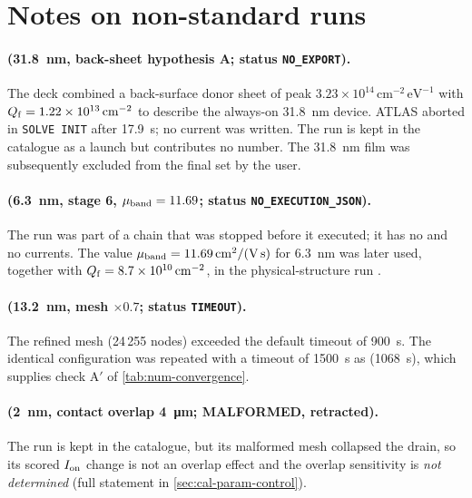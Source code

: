 

\section{Notes on non-standard runs}\label{sec:app-runs-notes}

\paragraph{ (\SI{31.8}{nm}, back-sheet hypothesis A; status \texttt{NO\_EXPORT}).} The deck combined a
back-surface donor sheet of peak $3.23\times10^{14}\,\mathrm{cm^{-2}\,eV^{-1}}$ with $Q_{\mathrm{f}} = 1.22\times10^{13}\,\mathrm{cm}^{-2}$ to
describe the always-on \SI{31.8}{nm} device. ATLAS aborted in \texttt{SOLVE INIT} after \SI{17.9}{s}; no current was
written. The run is kept in the catalogue as a launch but contributes no number. The \SI{31.8}{nm} film was
subsequently excluded from the final set by the user.

\paragraph{ (\SI{6.3}{nm}, stage 6, $\mu_{\mathrm{band}} = 11.69$; status \texttt{NO\_EXECUTION\_JSON}).} The run was
part of a chain that was stopped before it executed; it has no  and no currents. The value
$\mu_{\mathrm{band}} = \SI{11.69}{cm^2/(V.s)}$ for \SI{6.3}{nm} was later used, together with $Q_{\mathrm{f}} = 8.7\times10^{10}\,\mathrm{cm}^{-2}$, in the
physical-structure run .

\paragraph{ (\SI{13.2}{nm}, mesh $\times 0.7$; status \texttt{TIMEOUT}).} The refined mesh (24\,255 nodes)
exceeded the default timeout of \SI{900}{s}. The identical configuration was repeated with a timeout of \SI{1500}{s} as
 (\SI{1068}{s}), which supplies check A$'$ of \cref{tab:num-convergence}.

\paragraph{ (\SI{2}{nm}, contact overlap \SI{4}{\micro\metre}; MALFORMED, retracted).} The run is kept in the
catalogue, but its malformed mesh collapsed the drain, so its scored $I_{\mathrm{on}}$ change is not an overlap effect and the
overlap sensitivity is \emph{not determined} (full statement in \cref{sec:cal-param-control}).

